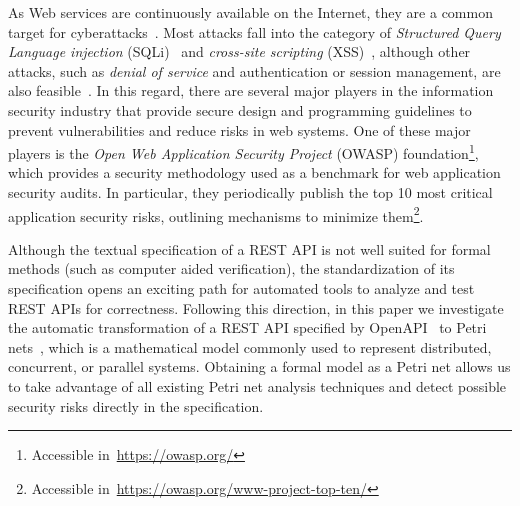 As Web services are continuously available on the Internet, they are a common target for cyberattacks~\cite{Clay2022}. Most attacks fall into the category of  \textit{Structured Query Language injection} (SQLi)~\cite{MSA-ICIT-21} and \textit{cross-site scripting} (XSS)~\cite{Emmons2022}, although other attacks, such as \textit{denial of service} and authentication or session management, are also feasible~\cite{saltQ32022}. In this regard, there are several major players in the information security industry that provide secure design and programming guidelines to prevent vulnerabilities and reduce risks in web systems. One of these major players is the {\em Open Web Application Security Project} (OWASP) foundation\footnote{Accessible in~\url{https://owasp.org/}}, which provides a security methodology used as a benchmark for web application security audits. In particular, they periodically publish the top 10 most critical application security risks, outlining mechanisms to minimize them\footnote{Accessible in~\url{https://owasp.org/www-project-top-ten/}}.

Although the textual specification of a REST API is not well suited for formal methods (such as computer aided verification), the standardization of its specification opens an exciting path for automated tools to analyze and test REST APIs for correctness. Following this direction, in this paper we investigate the automatic transformation of a REST API specified by OpenAPI~\cite{OpenAPISpecification} to Petri nets~\cite{Murata89}, which is a mathematical model commonly used to represent distributed, concurrent, or parallel systems.  Obtaining a formal model as a Petri net allows us to take advantage of  all existing Petri net analysis techniques and detect possible security risks directly in the specification.

